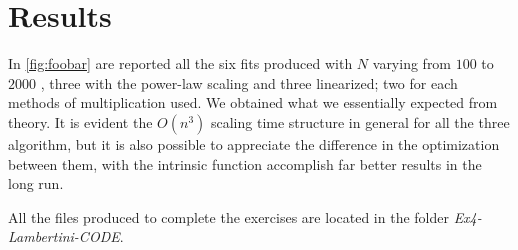 \documentclass[prb,9pt,notitlepage]{revtex4-1}
\begin{document}
\section{Results}
In \ref{fig:foobar} are reported all the six fits produced with $N$ varying from $100$ to $2000$ , three with the power-law scaling and three linearized; two for each methods of multiplication used. We obtained what we essentially expected from theory. It is evident the $O(n^3)$ scaling time structure in general for all the three algorithm, but it is also possible to appreciate the difference in the optimization between them, with the intrinsic function accomplish far better results in the long run.

All the files produced to complete the exercises are located in the folder \textit{Ex4-Lambertini-CODE}.
\end{document}
